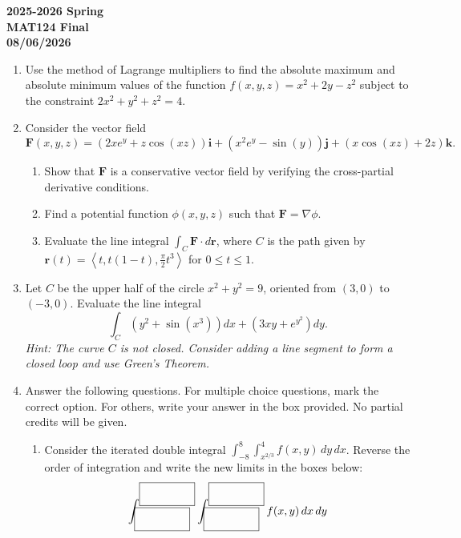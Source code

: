 \documentclass[a4paper, 12pt]{article}
\begin{document}
\newpage
{}
{}

\begin{center}
\textbf{2025-2026 Spring \\MAT124 Final\\08/06/2026}
\end{center}

\begin{enumerate}[leftmargin=*,label=\textbf{\arabic*.}]
\item Use the method of Lagrange multipliers to find the absolute maximum and absolute minimum values of the function $f(x, y, z) = x^2 + 2y - z^2$ subject to the constraint $2x^2 + y^2 + z^2 = 4$.

\item Consider the vector field
\[\mathbf{F}(x, y, z) = (2xe^y + z \cos(xz))\mathbf{i} + (x^2 e^y - \sin(y))\mathbf{j} + (x \cos(xz) + 2z)\mathbf{k}.\]
\begin{enumerate}[leftmargin=*,label=\textbf{\alph*.}]
\item Show that $\mathbf{F}$ is a conservative vector field by verifying the cross-partial derivative conditions.
\item Find a potential function $\phi(x, y, z)$ such that $\mathbf{F} = \nabla\phi$.
\item Evaluate the line integral $\int_C \mathbf{F} \cdot d\mathbf{r}$, where $C$ is the path given by \linebreak $\mathbf{r}(t) = \left\langle t, t(1-t), \frac{\pi}{2}t^3 \right\rangle$ for $0 \le t \le 1$.
\end{enumerate}

\item Let $C$ be the upper half of the circle $x^2 + y^2 = 9$, oriented from $(3, 0)$ to $(-3, 0)$. Evaluate the line integral
\[\int_C \left(y^2 + \sin(x^3)\right) dx + \left(3xy + e^{y^2}\right) dy.\]
\textit{Hint: The curve $C$ is not closed. Consider adding a line segment to form a closed loop and use Green's Theorem.}

\item Answer the following questions. For multiple choice questions, mark the correct option. For others, write your answer in the box provided. No partial credits will be given.

\begin{enumerate}[leftmargin=*, label=\textbf{\arabic{enumi}.\arabic*.}]
\item Consider the iterated double integral $\int_{-8}^8 \int_{x^{2/3}}^4 f(x, y)\,dy\,dx$. Reverse the order of integration and write the new limits in the boxes below:
\[\int_{\boxed{\phantom{\rule{1.5cm}{0.5cm}}}}^{\boxed{\phantom{\rule{1.5cm}{0.5cm}}}} \int_{\boxed{\phantom{\rule{1.5cm}{0.5cm}}}}^{\boxed{\phantom{\rule{1.5cm}{0.5cm}}}} f(x,y)\,dx\,dy\]


\end{enumerate}
\end{enumerate}
\end{document}
